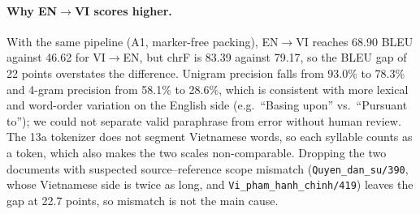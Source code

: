 \paragraph{Why EN$\to$VI scores higher.}
With the same pipeline (A1, marker-free packing), EN$\to$VI reaches 68.90 BLEU against 46.62 for VI$\to$EN, but chrF is 83.39 against 79.17, so the BLEU gap of 22 points overstates the difference.
Unigram precision falls from 93.0\% to 78.3\% and 4-gram precision from 58.1\% to 28.6\%, which is consistent with more lexical and word-order variation on the English side (e.g.\ ``Basing upon'' vs.\ ``Pursuant to''); we could not separate valid paraphrase from error without human review.
The 13a tokenizer does not segment Vietnamese words, so each syllable counts as a token, which also makes the two scales non-comparable.
Dropping the two documents with suspected source--reference scope mismatch (\texttt{Quyen\_dan\_su/390}, whose Vietnamese side is twice as long, and \texttt{Vi\_pham\_hanh\_chinh/419}) leaves the gap at 22.7 points, so mismatch is not the main cause.
